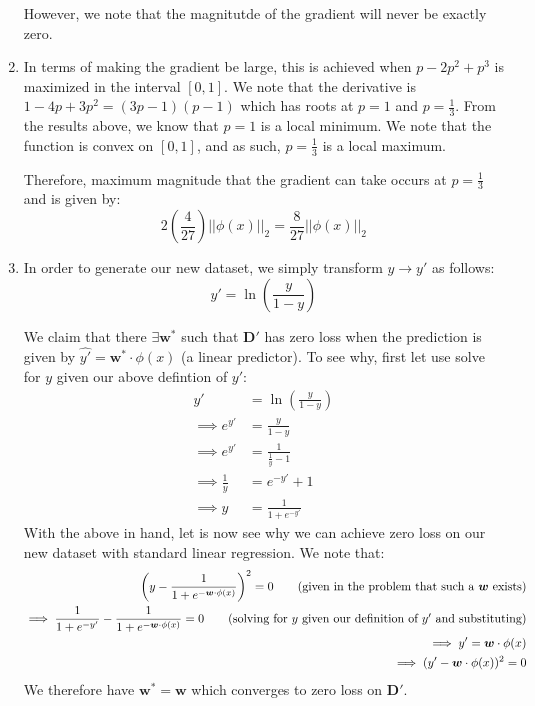 \documentclass[12pt]{article}
\begin{document}
\begin{enumerate}[label=(\alph*)]
  However, we note that the magnitutde of the gradient will never be exactly zero. 

  \item In terms of making the gradient be large, this is achieved when $p - 2p^2 + p^3$ is maximized in the interval $[0,1]$. We note that the derivative is $1 - 4p + 3p^2 = (3p - 1)(p - 1)$ which has roots at $p = 1$ and $p = \frac{1}{3}$. From the results above, we know that $p = 1$ is a local minimum. We note that the function is convex on $[0,1]$, and as such, $p = \frac{1}{3}$ is a local maximum.

  Therefore, maximum magnitude that the gradient can take occurs at $p = \frac{1}{3}$ and is given by:
  $$
    2\left(\frac{4}{27}\right) ||\phi(x) ||_2 = \frac{8}{27}||\phi(x)||_2
  $$

  \item In order to generate our new dataset, we simply transform $y \to y'$ as follows:
  $$
    y' = \ln \left( \frac{y}{1 -y}\right)
  $$

  We claim that there $\exists \bm{w}^*$ such that $\bm{D}'$ has zero loss when the prediction is given by $\hat{y'} = \bm{w}^*\cdot \phi(x)$ (a linear predictor). To see why, first let use solve for $y$ given our above defintion of $y'$:
  \begin{align*}
    y' &= \ln \left( \frac{y}{1- y}\right) \\
    \implies e^{y'} &= \frac{y}{1-y} \\
    \implies e^{y'} &= \frac{1}{\frac{1}{y} - 1} \\
    \implies \frac{1}{y} &= e^{-y'} + 1 \\
    \implies y &= \frac{1}{1 + e^{-y'}}
  \end{align*}
  With the above in hand, let is now see why we can achieve zero loss on our new dataset with standard linear regression. We note that:
  \begin{align*}
    \left(y - \frac{1}{1 + e^{-\bm{w}\cdot \phi(x)}}\right)^2 = 0 \tag{given in the problem that such a $\bm{w}$ exists} \\
    \implies \frac{1}{1 + e^{-y'} } - \frac{1}{1 + e^{-\bm{w}\cdot \phi(x)}} = 0 \tag{solving for $y$ given our definition of $y'$ and substituting} \\
    \implies y' = \bm{w}\cdot \phi(x) \\
    \implies (y' - \bm{w}\cdot \phi(x))^2 = 0
  \end{align*}
  We therefore have $\bm{w}^* = \bm{w}$ which converges to zero loss on $\bm{D}'$.

\end{enumerate}
\end{document}

